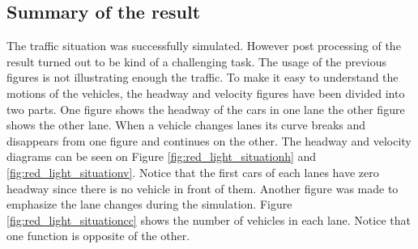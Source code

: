 		\subsection*{Summary of the result}
		The traffic situation was successfully simulated. However post processing of the result turned out to be kind of a challenging task. The usage of the previous figures is not illustrating enough the traffic. To make it easy to understand the motions of the vehicles, the headway and velocity figures have been divided into two parts. One figure shows the headway of the cars in one lane the other figure shows the other lane. When a vehicle changes lanes its curve breaks and disappears from one figure and continues on the other. The headway and velocity diagrams can be seen on Figure \ref{fig:red_light_situationh} and \ref{fig:red_light_situationv}. Notice that the first cars of each lanes have zero headway since there is no vehicle in front of them.  Another figure was made to emphasize the lane changes during the simulation. Figure \ref{fig:red_light_situationcc} shows the number of vehicles in each lane. Notice that one function is opposite of the other.
